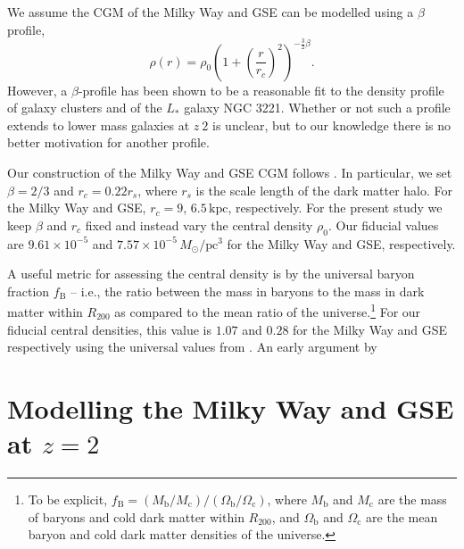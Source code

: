 \documentclass[linenumbers, twocolumn]{aastex631}
\newcommand{\Msun}{\ensuremath{M_{\odot}}}
\newcommand{\pc}{\ensuremath{\textrm{pc}}}
\begin{document}
We assume the CGM of the Milky Way and GSE can be modelled using a $\beta$ profile,
\begin{equation}
  \rho(r) = \rho_0 \left( 1 + \left(\frac{r}{r_c}\right)^2 \right)^{-\frac{3}{2}\beta}\textrm{.}
\end{equation}
However, a $\beta$-profile has been shown to be a reasonable fit to the density
profile of galaxy clusters and of the $L_{*}$ galaxy NGC 3221. Whether or not
such a profile extends to lower mass galaxies at $z~2$ is unclear, but to our
knowledge there is no better motivation for another profile.

Our construction of the Milky Way and GSE CGM follows
\citet{2023MNRAS.tmp.2070B}. In particular, we set $\beta=2/3$ and $r_c=0.22
r_s$, where $r_s$ is the scale length of the dark matter halo. For the Milky Way
and GSE, $r_c=9$, $6.5\,\textrm{kpc}$, respectively. For the present study we
keep $\beta$ and $r_c$ fixed and instead vary the central density $\rho_0$. Our
fiducial values are $9.61\times10^{-5}$ and $7.57\times10^{-5}\,\Msun/\pc^3$ for
the Milky Way and GSE, respectively.

A useful metric for assessing the central density is by the universal baryon
fraction $f_{\textrm{B}}$ -- i.e., the ratio between the mass in baryons to the
mass in dark matter within $R_{200}$ as compared to the mean ratio of the
universe.\footnote{To be explicit,
$f_{\textrm{B}}=(M_{\textrm{b}}/M_{\textrm{c}})/(\Omega_{\textrm{b}}/\Omega_{\textrm{c}})$,
where $M_{\textrm{b}}$ and $M_{\textrm{c}}$ are the mass of baryons and cold
dark matter within $R_{200}$, and $\Omega_{\textrm{b}}$ and
$\Omega_{\textrm{c}}$ are the mean baryon and cold dark matter densities of the
universe.} For our fiducial central densities, this value is $1.07$ and $0.28$
for the Milky Way and GSE respectively using the universal values from
\cite{2014AA...571A..16P}. An early argument by 

{}




\appendix

\section{Modelling the Milky Way and GSE at $z=2$}
\end{document}
